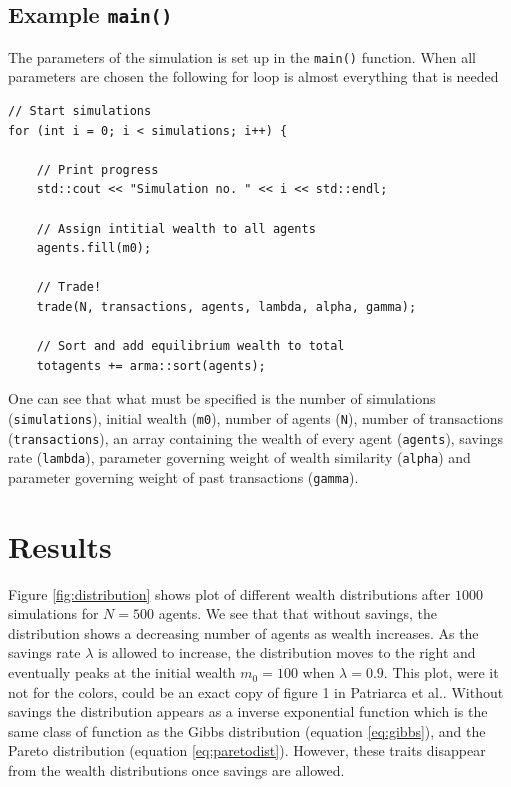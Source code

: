 \documentclass[10pt, a4paper]{amsart}
\begin{document}
\subsection{Example \lstinline|main()|}
The parameters of the simulation is set up in the \lstinline|main()| function. When all parameters are chosen the following for loop is almost everything that is needed
\begin{lstlisting}
// Start simulations
for (int i = 0; i < simulations; i++) {

	// Print progress
	std::cout << "Simulation no. " << i << std::endl;

	// Assign intitial wealth to all agents
	agents.fill(m0);

	// Trade!
	trade(N, transactions, agents, lambda, alpha, gamma);

	// Sort and add equilibrium wealth to total
	totagents += arma::sort(agents);
\end{lstlisting}
One can see that what must be specified is the number of simulations (\lstinline|simulations|), initial wealth (\lstinline|m0|), number of agents (\lstinline|N|), number of transactions (\lstinline|transactions|), an array containing the wealth of every agent (\lstinline|agents|), savings rate (\lstinline|lambda|), parameter governing weight of wealth similarity (\lstinline|alpha|) and parameter governing weight of past transactions (\lstinline|gamma|).


\section{Results}


Figure \ref{fig:distribution} shows plot of different wealth distributions after $1000$ simulations for $N=500$ agents. We see that that without savings, the distribution shows a decreasing number of agents as wealth increases. As the savings rate $\lambda$ is allowed to increase, the distribution moves to the right and eventually peaks at the initial wealth $m_0 = 100$ when $\lambda = 0.9$. This plot, were it not for the colors, could be an exact copy of figure 1 in Patriarca et al.\cite{Patriarca}. Without savings the distribution appears as a inverse exponential function which is the same class of function as the Gibbs distribution (equation \ref{eq:gibbs}), and the Pareto distribution (equation \ref{eq:paretodist}). However, these traits disappear from the wealth distributions once savings are allowed.
\end{document}

